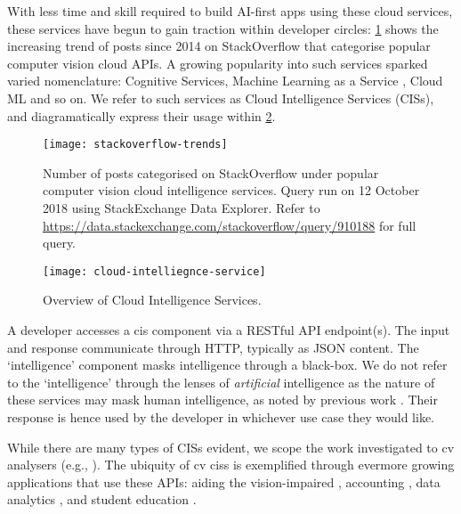 With less time and skill required to build \gls{AI}-first apps using these cloud services,  these services have begun to gain traction within developer circles: \cref{fig:introduction:stackoverflow-trends} shows the increasing trend of posts since 2014 on StackOverflow that categorise popular computer vision cloud APIs. A growing popularity into such services sparked varied nomenclature: Cognitive Services, Machine Learning as a Service \citep{Ribeiro:2015dz}, Cloud ML and so on. We refer to such services as Cloud Intelligence Services (\glspl{CIS}), and diagramatically express their usage within \cref{fig:introduction:cloud-intelliegnce-service}.

\begin{figure}[t]
\centering
\caption{Number of posts categorised on StackOverflow under popular computer vision cloud intelligence services. Query run on 12 October 2018 using StackExchange Data Explorer. Refer to \url{https://data.stackexchange.com/stackoverflow/query/910188} for full query.}
\label{fig:introduction:stackoverflow-trends}
\texttt{[image: stackoverflow-trends]}
\end{figure}

\begin{figure}[th]
\centering
\caption{Overview of Cloud Intelligence Services.}
\label{fig:introduction:cloud-intelliegnce-service}
\texttt{[image: cloud-intelliegnce-service]}
\end{figure}
 
 
A developer accesses a \gls{cis} component via a RESTful API endpoint(s). The input and response communicate through HTTP, typically as JSON content. The `intelligence' component masks intelligence through a black-box. We do not refer to the `intelligence' through the lenses of \textit{artificial} intelligence as the nature of these services may mask human intelligence, as noted by previous work . Their response is hence used by the developer in whichever use case they would like.

While there are many types of \glspl{CIS} evident, we scope the work investigated to \gls{cv} analysers (e.g., \citep{GoogleCloud:Home,Azure:Home,AWS:Home,Pixlab:Home,IBM:Home,Cloudsight:Home,Clarifai:Home,DeepAI:Home,Imagaa:Home,Talkwaler:Home}). The ubiquity of \gls{cv} \glspl{cis} is exemplified through evermore growing applications that use these APIs: aiding the vision-impaired \citep{Reis:2018cp,daMotaSilveira:2017vp}, accounting  \citep{Marshall:2018uj}, data analytics \citep{Iyengar:2017fb}, and student education \citep{Dibia:2017iy}. 
  
  
